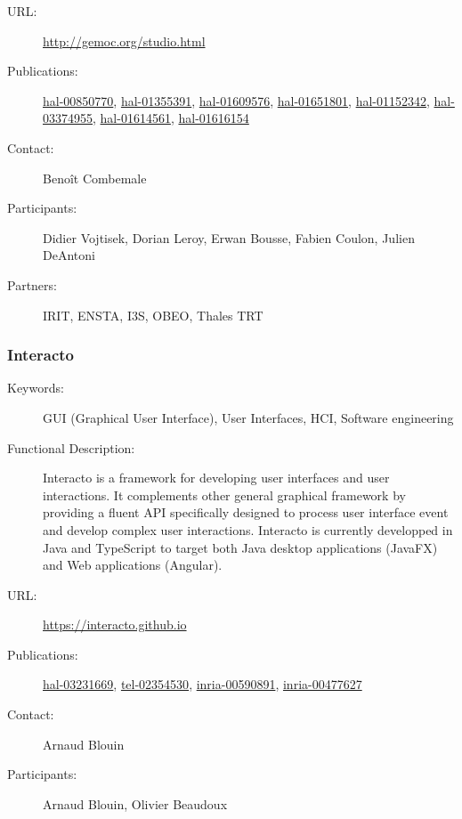 \begin{description}



\item[URL:] \url{http://gemoc.org/studio.html}
\item[Publications:] \href{https://hal.inria.fr/hal-00850770}{hal-00850770}, \href{https://hal.inria.fr/hal-01355391}{hal-01355391}, \href{https://hal.inria.fr/hal-01609576}{hal-01609576}, \href{https://hal.inria.fr/hal-01651801}{hal-01651801}, \href{https://hal.inria.fr/hal-01152342}{hal-01152342}, \href{https://hal.inria.fr/hal-03374955}{hal-03374955}, \href{https://hal.inria.fr/hal-01614561}{hal-01614561}, \href{https://hal.inria.fr/hal-01616154}{hal-01616154}
\item[Contact:] Benoît Combemale
\item[Participants:] Didier Vojtisek, Dorian Leroy, Erwan Bousse, Fabien Coulon, Julien DeAntoni
\item[Partners:] IRIT, ENSTA, I3S, OBEO, Thales TRT
\end{description}

\subsubsection{Interacto}
\label{bil-2542}
\begin{description}
\item[Keywords:] GUI (Graphical User Interface), User Interfaces, HCI, Software engineering


\item[Functional Description:]
Interacto is a framework for developing user interfaces and user interactions. It complements other general graphical framework by providing a fluent API specifically designed to process user interface event and develop complex user interactions. Interacto is currently developped in Java and TypeScript to target both Java desktop applications (JavaFX) and Web applications (Angular).




\item[URL:] \url{https://interacto.github.io}
\item[Publications:] \href{https://hal.inria.fr/hal-03231669}{hal-03231669}, \href{https://hal.inria.fr/tel-02354530}{tel-02354530}, \href{https://hal.inria.fr/inria-00590891}{inria-00590891}, \href{https://hal.inria.fr/inria-00477627}{inria-00477627}
\item[Contact:] Arnaud Blouin
\item[Participants:] Arnaud Blouin, Olivier Beaudoux
\end{description}

